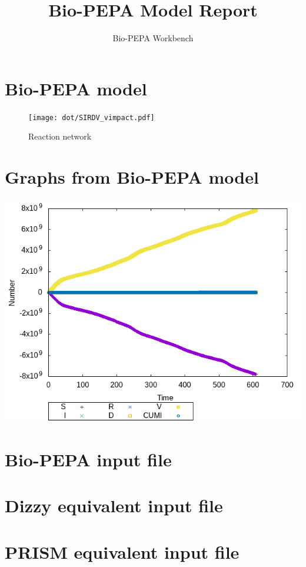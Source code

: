 \documentclass{llncs}
\title{Bio-PEPA Model Report}
\author{Bio-PEPA Workbench}
\institute{\today}
\begin{document}
\maketitle
\section{Bio-PEPA model}

\begin{figure}[htbp]
\begin{center}
\texttt{[image: dot/SIRDV\_vimpact.pdf]}
\caption{Reaction network}
\end{center}
\end{figure}
\newpage
\section{Graphs from Bio-PEPA model}
\includegraphics[scale=1]{png/SIRDV_vimpact001_sundials_results_0}
\appendix
\newpage
\section{Bio-PEPA input file}

\newpage
\section{Dizzy equivalent input file}

\newpage
\section{PRISM equivalent input file}

\end{document}
